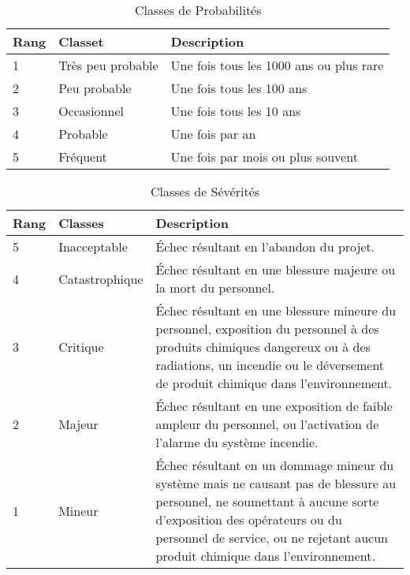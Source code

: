 \documentclass[12pt]{article}
\begin{document}
 
\begin{table}[H]
\centering
\begin{tabular}{ p{2cm} p{3cm} p{8cm}}
\hline \bf Rang & \bf Classet & \bf Description \\
\hline 1 & Très peu probable & Une fois tous les 1000 ans ou plus rare \\
2 & Peu probable & Une fois tous les 100 ans \\
3 & Occasionnel & Une fois tous les 10 ans\\
4 & Probable & Une fois par an\\
5 & Fréquent & Une fois par mois ou plus souvent \\

\hline

\end{tabular}
\caption{Classes de Probabilités}

\end{table}

 
\begin{table}[H]
\centering
\begin{tabular}{ p{2cm} p{3cm} p{8cm}}
\hline \bf Rang & \bf Classes & \bf Description \\

\hline 5 & Inacceptable & Échec résultant en l’abandon du projet.\\
4 & Catastrophique & Échec résultant en une blessure majeure ou la mort du personnel. \\
3 & Critique & Échec résultant en une blessure mineure du personnel, exposition du personnel à des produits chimiques dangereux ou à des radiations, un incendie ou le déversement de produit chimique dans l’environnement. \\
2 & Majeur & Échec résultant en une exposition de faible ampleur du personnel, ou l’activation de l’alarme du système incendie.\\
1 & Mineur & Échec résultant en un dommage mineur du système mais ne causant pas de blessure au personnel, ne soumettant à aucune sorte d’exposition des opérateurs ou du personnel de service, ou ne rejetant aucun produit chimique dans l’environnement. \\
\hline
\end{tabular}
\caption{Classes de Sévérités}
\end{table}
\end{document}
